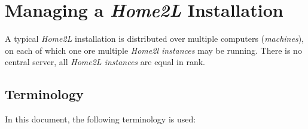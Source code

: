 \documentclass[12pt,english,parskip=half]{scrreprt}
\begin{document}
\chapter{Managing a \emph{Home2L} Installation}
\label{ch:managing}


A typical \emph{Home2L} installation is distributed over multiple
computers (\emph{machines}), on each of which one ore multiple \emph{Home2l instances}
may be running. There is no central server, all \emph{Home2L instances} are equal in rank.





\section{Terminology}
\label{sec:managing-terminology}


In this document, the following terminology is used:
\end{document}
